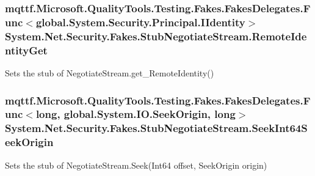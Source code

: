 \hypertarget{class_system_1_1_net_1_1_security_1_1_fakes_1_1_stub_negotiate_stream_a598e8d2ee6905b5851c04d22332332fd}{
\subsubsection[{Remote\-Identity\-Get}]{\setlength{\rightskip}{0pt plus 5cm}mqttf.\-Microsoft.\-Quality\-Tools.\-Testing.\-Fakes.\-Fakes\-Delegates.\-Func$<$global.\-System.\-Security.\-Principal.\-I\-Identity$>$ System.\-Net.\-Security.\-Fakes.\-Stub\-Negotiate\-Stream.\-Remote\-Identity\-Get}}\label{class_system_1_1_net_1_1_security_1_1_fakes_1_1_stub_negotiate_stream_a598e8d2ee6905b5851c04d22332332fd}


Sets the stub of Negotiate\-Stream.\-get\-\_\-\-Remote\-Identity()

\hypertarget{class_system_1_1_net_1_1_security_1_1_fakes_1_1_stub_negotiate_stream_aa53655782a349a631e2cf74b42c95de6}{
\subsubsection[{Seek\-Int64\-Seek\-Origin}]{\setlength{\rightskip}{0pt plus 5cm}mqttf.\-Microsoft.\-Quality\-Tools.\-Testing.\-Fakes.\-Fakes\-Delegates.\-Func$<$long, global.\-System.\-I\-O.\-Seek\-Origin, long$>$ System.\-Net.\-Security.\-Fakes.\-Stub\-Negotiate\-Stream.\-Seek\-Int64\-Seek\-Origin}}\label{class_system_1_1_net_1_1_security_1_1_fakes_1_1_stub_negotiate_stream_aa53655782a349a631e2cf74b42c95de6}


Sets the stub of Negotiate\-Stream.\-Seek(\-Int64 offset, Seek\-Origin origin)

